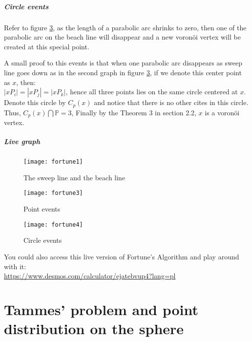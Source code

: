 \documentclass[12pt]{article}
\numberwithin{equation}{section}
\let\bb\mathbb
\let\bb\mathbb
\begin{document}
		\subsubsection{Circle events}
			Refer to figure \ref{fig:fortune4}, as the length of a parabolic arc shrinks to zero, then one of the parabolic arc on the beach line will disappear and a new voronöi vertex will be created at this special point.\par 
			A small proof to this events is that when one parabolic arc disappears as sweep line goes down as in the second graph in figure \ref{fig:fortune4}, if we denote this center point as $x$, then:\\
			$|xP_i| = |xP_j| = |xP_k|$, hence all three points lies on the same circle centered at $x$. Denote this circle by $C_p(x)$ and notice that there is no other cites in this circle. Thus, $C_p(x)\bigcap \bb{P} = 3$, Finally by the Theorem 3 in section 2.2, $x$ is a voronöi vertex.
		\subsubsection{Live graph}
		
		\begin{figure}
			\centering
			\texttt{[image: fortune1]}
			\caption{The sweep line and the beach line}
			\label{fig:fortune1}
		\end{figure}
		
		\begin{figure}
			\centering
			\texttt{[image: fortune3]}
			\caption{Point events}
			\label{fig:fortune3}
		\end{figure}
		
		\begin{figure}
			\centering
			\texttt{[image: fortune4]}
			\caption{Circle events}
			\label{fig:fortune4}
		\end{figure}
		
		You could also access this live version of Fortune's Algorithm and play around with it: \\
		\url{https://www.desmos.com/calculator/ejatebvup4?lang=pl}
	
	
	\newpage
	
	\part{Tammes' problem and point distribution on the sphere}
	\newpage
	
\end{document}
